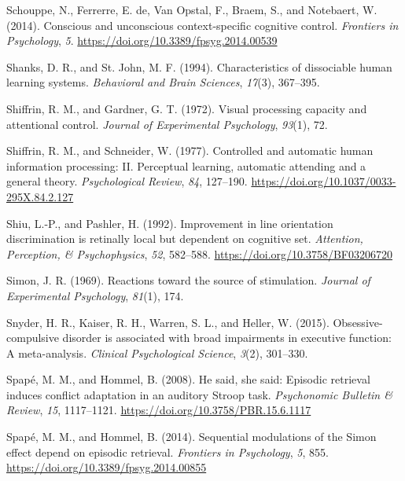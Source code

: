 \documentclass[]{DissertateCUNY}
\begin{document}
\leavevmode\hypertarget{ref-schouppe_conscious_2014}{}%
Schouppe, N., Ferrerre, E. de, Van Opstal, F., Braem, S., and Notebaert,
W. (2014). Conscious and unconscious context-specific cognitive control.
\emph{Frontiers in Psychology}, \emph{5}.
\url{https://doi.org/10.3389/fpsyg.2014.00539}

\leavevmode\hypertarget{ref-shanks_characteristics_1994}{}%
Shanks, D. R., and St. John, M. F. (1994). Characteristics of
dissociable human learning systems. \emph{Behavioral and Brain
Sciences}, \emph{17}(3), 367--395.

\leavevmode\hypertarget{ref-shiffrin_visual_1972}{}%
Shiffrin, R. M., and Gardner, G. T. (1972). Visual processing capacity
and attentional control. \emph{Journal of Experimental Psychology},
\emph{93}(1), 72.

\leavevmode\hypertarget{ref-shiffrin_controlled_1977}{}%
Shiffrin, R. M., and Schneider, W. (1977). Controlled and automatic
human information processing: II. Perceptual learning, automatic
attending and a general theory. \emph{Psychological Review}, \emph{84},
127--190. \url{https://doi.org/10.1037/0033-295X.84.2.127}

\leavevmode\hypertarget{ref-shiu_improvement_1992}{}%
Shiu, L.-P., and Pashler, H. (1992). Improvement in line orientation
discrimination is retinally local but dependent on cognitive set.
\emph{Attention, Perception, \& Psychophysics}, \emph{52}, 582--588.
\url{https://doi.org/10.3758/BF03206720}

\leavevmode\hypertarget{ref-simon_reactions_1969}{}%
Simon, J. R. (1969). Reactions toward the source of stimulation.
\emph{Journal of Experimental Psychology}, \emph{81}(1), 174.

\leavevmode\hypertarget{ref-snyder_obsessive-compulsive_2015}{}%
Snyder, H. R., Kaiser, R. H., Warren, S. L., and Heller, W. (2015).
Obsessive-compulsive disorder is associated with broad impairments in
executive function: A meta-analysis. \emph{Clinical Psychological
Science}, \emph{3}(2), 301--330.

\leavevmode\hypertarget{ref-spape_he_2008}{}%
Spapé, M. M., and Hommel, B. (2008). He said, she said: Episodic
retrieval induces conflict adaptation in an auditory Stroop task.
\emph{Psychonomic Bulletin \& Review}, \emph{15}, 1117--1121.
\url{https://doi.org/10.3758/PBR.15.6.1117}

\leavevmode\hypertarget{ref-spape_sequential_2014}{}%
Spapé, M. M., and Hommel, B. (2014). Sequential modulations of the Simon
effect depend on episodic retrieval. \emph{Frontiers in Psychology},
\emph{5}, 855. \url{https://doi.org/10.3389/fpsyg.2014.00855}
\end{document}
